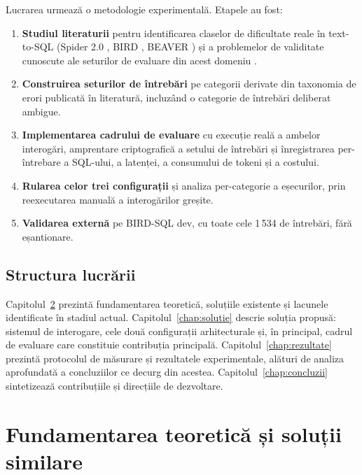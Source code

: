 \documentclass[12pt,a4paper]{report}
\begin{document}
Lucrarea urmează o metodologie experimentală.
Etapele au fost:

\begin{enumerate}[nosep,leftmargin=*]
  \item \textbf{Studiul literaturii} pentru identificarea claselor de
    dificultate reale în text-to-SQL (Spider 2.0 \cite{spider2}, BIRD
    \cite{bird}, BEAVER \cite{beaver}) și a problemelor de validitate
    cunoscute ale seturilor de evaluare din acest domeniu \cite{brokenbench}.
  \item \textbf{Construirea seturilor de întrebări} pe categorii derivate
    din taxonomia de erori publicată în literatură, incluzând o
    categorie de întrebări deliberat ambigue.
  \item \textbf{Implementarea cadrului de evaluare} cu execuție reală a
    ambelor interogări, amprentare criptografică a setului de întrebări și
    înregistrarea per-întrebare a SQL-ului, a latenței, a consumului de
    tokeni și a costului.
  \item \textbf{Rularea celor trei configurații} și analiza per-categorie a
    eșecurilor, prin reexecutarea manuală a interogărilor greșite.
  \item \textbf{Validarea externă} pe BIRD-SQL dev, cu toate cele 1\,534 de
    întrebări, fără eșantionare.
\end{enumerate}

\section{Structura lucrării}

Capitolul~\ref{chap:teorie} prezintă fundamentarea teoretică, soluțiile existente și lacunele
identificate în stadiul actual. Capitolul~\ref{chap:solutie} descrie soluția propusă: sistemul
de interogare, cele două configurații arhitecturale și, în principal, cadrul de
evaluare care constituie contribuția principală. Capitolul~\ref{chap:rezultate} prezintă
protocolul de măsurare și rezultatele experimentale, alături de analiza aprofundată a
concluziilor ce decurg din acestea. Capitolul~\ref{chap:concluzii} sintetizează
contribuțiile și direcțiile de dezvoltare.

\chapter{Fundamentarea teoretică și soluții similare}
\label{chap:teorie}
\end{document}
